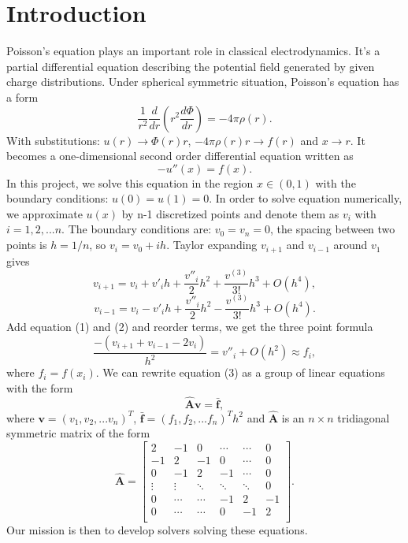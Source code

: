 \documentclass[12pt]{article}
\begin{document}
\section{Introduction}

Poisson's equation plays an important role in classical electrodynamics. It's a partial differential equation describing the potential field generated by given charge distributions. Under spherical symmetric situation, Poisson's equation has a form\cite{morten}
\[
\frac{1}{r^2}\frac{d}{dr}(r^2\frac{d\Phi}{dr}) = -4\pi\rho(r).
\]
With substitutions: $u(r) \to \Phi(r)r$, $-4\pi\rho(r)r \to f(r)$ and  $x \to r$. It becomes a one-dimensional second order differential equation written as
\[
-u''(x) = f(x).
\]
In this project, we solve this equation in the region $x \in(0,1)$ with the boundary conditions: $u(0) = u(1) =0$.
In order to solve equation numerically, we approximate $u(x)$ by n-1 discretized points and denote them as $v_i$ with $i = 1, 2, ... n$. The boundary conditions are: $v_0 = v_n = 0$, the spacing between two points is $h = 1/n$, so $v_i = v_0 + ih$. 
Taylor expanding $v_{i+1}$ and $v_{i-1}$ around $v_{1}$ gives
\begin{equation}
v_{i+1} = v_i + v'_ih + \frac{v''_i}{2}h^2 + \frac{v^{(3)}}{3!}h^3 + O(h^4), 
\end{equation}
\begin{equation}
v_{i-1} = v_i - v'_ih + \frac{v''_i}{2}h^2 - \frac{v^{(3)}}{3!}h^3 + O(h^4). 
\end{equation}
Add equation (1) and (2) and reorder terms, we get the three point formula
\begin{equation}
\frac{-(v_{i+1} + v_{i-1} - 2v_{i})}{h^2} = v''_i + O(h^2) \approx f_i,
\end{equation}
where $f_i = f(x_i)$. We can rewrite equation (3) as a group of linear equations with the form
\[
\mathbf{\hat{A}v = \bar{f}},
\]
where $\mathbf{v} = (v_1, v_2, ... v_n)^T$, $\mathbf{\bar{f}} = (f_1, f_2, ... f_n)^Th^2$ and $\mathbf{\hat{A}}$ is an $n \times n$ tridiagonal symmetric matrix of the form
\[   
\mathbf{\hat{A}} = \left[\begin{array}{cccccc}   
    2 &    -1    & 0   & \cdots  & \cdots  & 0\\   
    -1 &    2    & -1  & 0       & \cdots  & 0\\
    0 &    -1    & 2  & -1       & \cdots  & 0\\ 
    \vdots &    \vdots    & \ddots  & \ddots  & \ddots  & 0\\ 
    0 &    \cdots    & \cdots  & -1       & 2  & -1\\ 
    0 &    \cdots    & \cdots  & 0       & -1  & 2\\ 
\end{array}\right].   
\]
Our mission is then to develop solvers solving these equations.
\end{document}

